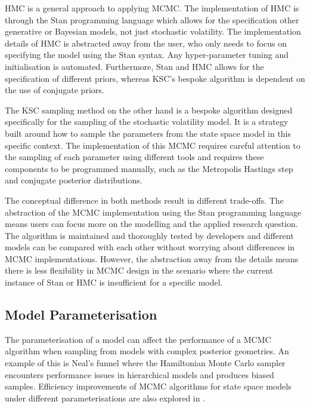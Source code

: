 \documentclass[12pt, a4paper]{article}
\begin{document}
        HMC is a general approach to applying MCMC. The implementation of HMC is through the Stan programming language which allows for the specification other generative or Bayesian models, not just stochastic volatility. The implementation details of HMC is abstracted away from the user, who only needs to focus on specifying the model using the Stan syntax. Any hyper-parameter tuning and initialisation is automated. Furthermore, Stan and HMC allows for the specification of different priors, whereas KSC's bespoke algorithm is dependent on the use of conjugate priors. 
        
        The KSC sampling method on the other hand is a bespoke algorithm designed specifically for the sampling of the stochastic volatility model. It is a strategy built around how to sample the parameters from the state space model in this specific context. The implementation of this MCMC requires careful attention to the sampling of each parameter using different tools and requires these components to be programmed manually, such as the Metropolis Hastings step and conjugate posterior distributions. 

        The conceptual difference in both methods result in different trade-offs. The abstraction of the MCMC implementation using the Stan programming language means users can focus more on the modelling and the applied research question. The algorithm is maintained and thoroughly tested by developers and different models can be compared with each other without worrying about differences in MCMC implementations. However, the abstraction away from the details means there is less flexibility in MCMC design in the scenario where the current instance of Stan or HMC is insufficient for a specific model.
        
    \subsection{Model Parameterisation}

        The parameterisation of a model can affect the performance of a MCMC algorithm when sampling from models with complex posterior geometries. An example of this is Neal's funnel \citep{neal2003slice} where the Hamiltonian Monte Carlo sampler encounters performance issues in hierarchical models and produces biased samples. Efficiency improvements of MCMC algorithms for state space models under different parameterisations are also explored in \citet{strickland2008parameterisation}.
\end{document}
